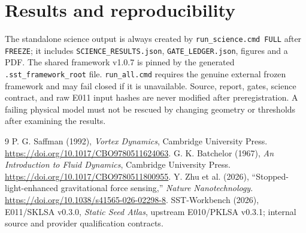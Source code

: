 \documentclass[11pt,a4paper]{article}
\begin{document}
\section{Results and reproducibility}
The standalone science output is always created by \texttt{run\_science.cmd FULL} after \texttt{FREEZE}; it includes \texttt{SCIENCE\_RESULTS.json}, \texttt{GATE\_LEDGER.json}, figures and a PDF. The shared framework v1.0.7 is pinned by the generated \texttt{.sst\_framework\_root} file. \texttt{run\_all.cmd} requires the genuine external frozen framework and may fail closed if it is unavailable. Source, report, gates, science contract, and raw E011 input hashes are never modified after preregistration. A failing physical model must not be rescued by changing geometry or thresholds after examining the results.
\begin{thebibliography}{9}
P. G. Saffman (1992), \emph{Vortex Dynamics}, Cambridge University Press. \url{https://doi.org/10.1017/CBO9780511624063}.
G. K. Batchelor (1967), \emph{An Introduction to Fluid Dynamics}, Cambridge University Press. \url{https://doi.org/10.1017/CBO9780511800955}.
Y. Zhu et al. (2026), ``Stopped-light-enhanced gravitational force sensing,'' \emph{Nature Nanotechnology}. \url{https://doi.org/10.1038/s41565-026-02298-8}.
SST-Workbench (2026), E011/SKLSA v0.3.0, \emph{Static Seed Atlas}, upstream E010/PKLSA v0.3.1; internal source and provider qualification contracts.
\end{thebibliography}
\end{document}
